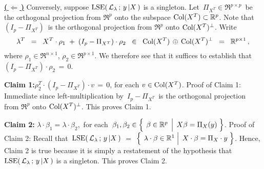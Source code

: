 \vskip 0.5cm\noindent
\underline{\textbf{(\,$\Longleftarrow$\,)}}\quad
Conversely, suppose $\textnormal{LSE}\!\left(\,\mathcal{L}_{\lambda} \,;\, y\,\vert X\,\right)$ is a singleton.
Let \,$\Pi_{X^{T}} \in \Re^{p \times p}$\, be the orthogonal projection from $\Re^{p}$ onto
the subspace $\textnormal{Col}(X^{T}) \subset \mathbb{R}^{p}$.
Note that \,$(I_{p} - \Pi_{X^{T}})$\, is the orthogonal projection from $\Re^{p}$ onto $\textnormal{Col}(X^{T})^{\perp}$.
Write
\begin{equation*}
\lambda^{T}
\;\;=\;\;
	X^{T} \cdot \rho_{1} \;+\; (I_{p} - \Pi_{X^{T}}) \cdot \rho_{2}
\;\;\in\;\;
	\textnormal{Col}(X^{T}) \,\oplus\, \textnormal{Col}(X^{T})^{\perp}
\;\;=\;\;
	\mathbb{R}^{p \times 1}\,,
\end{equation*}
where $\rho_{1} \in \Re^{n \times 1}$, $\rho_{2} \in \Re^{p \times 1}$.
We therefore see that it suffices to establish that $(I_{p} - \Pi_{X^{T}}) \cdot \rho_{2} \,=\, 0$.

\vskip 0.5cm
\noindent
\textbf{Claim 1:}\quad $\rho_{2}^{T} \cdot (I_{p} - \Pi_{X^{T}}) \cdot v \,=\, 0$,
for each $v \in \textnormal{Col}(X^{T})$.
\vskip 0.2cm
\noindent
Proof of Claim 1:\quad
Immediate since left-multiplication by \,$I_{p} - \Pi_{X^{T}}$\, is the orthogonal projection
from $\Re^{p}$ onto $\textnormal{Col}(X^{T})^{\perp}$. This proves Claim 1.

\vskip 0.5cm
\noindent
\textbf{Claim 2:}\quad
$\lambda\cdot\beta_{1} = \lambda\cdot\beta_{2}$,\,
for each \,$\beta_{1}, \beta_{2} \in \left\{\;\left.\overset{{\color{white}.}}{\beta} \in \Re^{p} \;\,\right\vert\; X\beta=\Pi_{X}(y) \;\right\}$.
\vskip 0.2cm
\noindent
Proof of Claim 2:\quad
Recall that \,$\textnormal{LSE}\!\left(\,\mathcal{L}_{\lambda}\,;\,y\,\vert X\,\right)$ $=$
$\left\{\;\left.\overset{{\color{white}.}}{\lambda}\cdot\beta\in\Re^{1}\;\right\vert\;X\cdot\beta=\Pi_{X}\cdot y\;\right\}$.
Hence, Claim 2 is true because it is simply a restatement of the hypothesis that
$\textnormal{LSE}\!\left(\,\mathcal{L}_{\lambda}\,;\,y\,\vert X\,\right)$ is a singleton.
This proves Claim 2.

